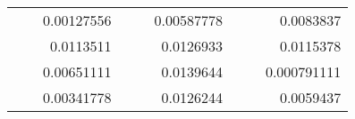 \begin{table}[H]
\begin{tabular}{|ccrccrccc}
\rowcolor[HTML]{DDFDFF} 
\multicolumn{1}{|c|}{\cellcolor[HTML]{FFFFC7}}                                & \multicolumn{1}{c|}{\cellcolor[HTML]{DDFDFF}}                      & \multicolumn{1}{r|}{\cellcolor[HTML]{DAE8FC}0.00127556}  & \multicolumn{1}{c|}{\cellcolor[HTML]{FFFFC7}}                                & \multicolumn{1}{c|}{\cellcolor[HTML]{DDFDFF}}                       & \multicolumn{1}{r|}{\cellcolor[HTML]{DDFDFF}0.00587778}  & \multicolumn{1}{c|}{\cellcolor[HTML]{FFFFC7}}                                & \multicolumn{1}{c|}{\cellcolor[HTML]{DDFDFF}}                      & \multicolumn{1}{r|}{\cellcolor[HTML]{DDFDFF}0.0083837}   \\ \cline{3-3} \cline{6-6} \cline{9-9} 
\multicolumn{1}{|c|}{\cellcolor[HTML]{FFFFC7}}                                & \multicolumn{1}{c|}{\cellcolor[HTML]{DDFDFF}}                      & \multicolumn{1}{r|}{\cellcolor[HTML]{DDFDFF}0.0113511}   & \multicolumn{1}{c|}{\cellcolor[HTML]{FFFFC7}}                                & \multicolumn{1}{c|}{\cellcolor[HTML]{DDFDFF}}                       & \multicolumn{1}{r|}{\cellcolor[HTML]{DAE8FC}0.0126933}   & \multicolumn{1}{c|}{\cellcolor[HTML]{FFFFC7}}                                & \multicolumn{1}{c|}{\cellcolor[HTML]{DDFDFF}}                      & \multicolumn{1}{r|}{\cellcolor[HTML]{DAE8FC}0.0115378}   \\ \cline{3-3} \cline{6-6} \cline{9-9} 
\rowcolor[HTML]{DDFDFF} 
\multicolumn{1}{|c|}{\cellcolor[HTML]{FFFFC7}}                                & \multicolumn{1}{c|}{\cellcolor[HTML]{DDFDFF}}                      & \multicolumn{1}{r|}{\cellcolor[HTML]{DAE8FC}0.00651111}  & \multicolumn{1}{c|}{\cellcolor[HTML]{FFFFC7}}                                & \multicolumn{1}{c|}{\cellcolor[HTML]{DDFDFF}}                       & \multicolumn{1}{r|}{\cellcolor[HTML]{DDFDFF}0.0139644}   & \multicolumn{1}{c|}{\cellcolor[HTML]{FFFFC7}}                                & \multicolumn{1}{c|}{\cellcolor[HTML]{DDFDFF}}                      & \multicolumn{1}{r|}{\cellcolor[HTML]{DDFDFF}0.000791111} \\ \cline{3-3} \cline{6-6} \cline{9-9} 
\multicolumn{1}{|c|}{\cellcolor[HTML]{FFFFC7}}                                & \multicolumn{1}{c|}{\cellcolor[HTML]{DDFDFF}}                      & \multicolumn{1}{r|}{\cellcolor[HTML]{DDFDFF}0.00341778}  & \multicolumn{1}{c|}{\cellcolor[HTML]{FFFFC7}}                                & \multicolumn{1}{c|}{\cellcolor[HTML]{DDFDFF}}                       & \multicolumn{1}{r|}{\cellcolor[HTML]{DAE8FC}0.0126244}   & \multicolumn{1}{c|}{\cellcolor[HTML]{FFFFC7}}                                & \multicolumn{1}{c|}{\cellcolor[HTML]{DDFDFF}}                      & \multicolumn{1}{r|}{\cellcolor[HTML]{DAE8FC}0.0059437}   \\ \cline{3-3} \cline{6-6} \cline{9-9} 

\end{tabular}
\end{table}

